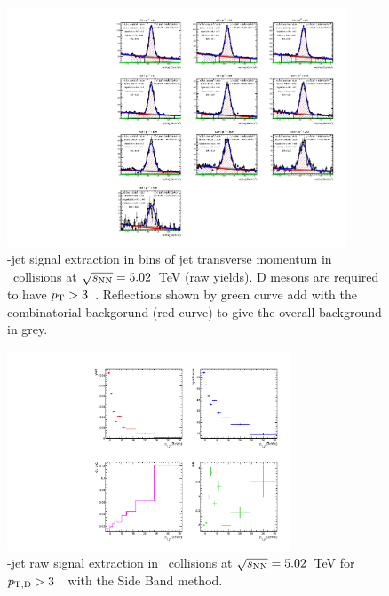 \begin{figure}[bth]
\centering
\includegraphics[width=0.9\textwidth]{pPbplotsD0/Default/signalExtraction/plots/invMass_LHC16R03_pTD3.pdf}
\caption{\Dzero-jet signal extraction in bins of jet transverse momentum in \pPb\ collisions at $\sqrt{s_{\rm NN}}=5.02$~TeV (raw yields). D mesons are required to have $p_{\rm T}>3$~\GeVc. 
Reflections shown by green curve add with the combinatorial backgorund (red curve) to give the overall background in grey.
}
\label{fig:eq_pPb_InvMass_Dzero_Dbins}
\end{figure}

\begin{figure}[bth]
\centering
\includegraphics[width=0.75\textwidth]{pPbplotsD0/Default/signalExtraction/plots/signalParams_LHC16R03_pTD3.pdf}
\caption{\Dzero-jet raw signal extraction in \pPb\ collisions at $\sqrt{s_{\rm NN}}=5.02$~TeV for $p_{\mathrm{T,D}}>3$~\GeVc\ with the Side Band method.}
\label{fig:eq_pPb_RSU_raw_Dbins_Dzero}
\end{figure}

